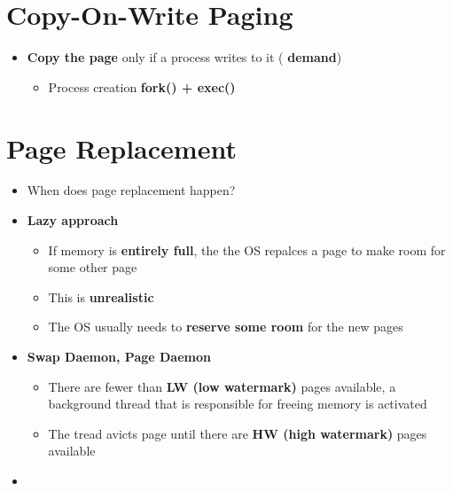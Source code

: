 \documentclass[a4paper,11pt,english]{article}
\begin{document}
\section*{Copy-On-Write Paging}
\begin{itemize}
    \item \textbf{\color{blue} Copy the page} only if a process writes to it (\textbf{\color{blue} demand})
        \begin{itemize}
            \item Process creation \textbf{\color{blue} fork() + exec()}
        \end{itemize}
\end{itemize}

\section*{Page Replacement}
\begin{itemize}
    \item When does page replacement happen?
    \item \textbf{\color{blue} Lazy approach}
        \begin{itemize}
            \item If memory is \textbf{\color{red} entirely full}, the the OS repalces a page to make room for some other page
            \item This is \textbf{\color{red} unrealistic}
            \item The OS usually needs to \textbf{\color{blue} reserve some room} for the new pages
        \end{itemize}
    \item \textbf{\color{blue} Swap Daemon, Page Daemon}
        \begin{itemize}
            \item There are fewer than \textbf{\color{red} LW (low watermark)} pages available, a background thread that is responsible for freeing memory is activated 
            \item The tread avicts page until there are \textbf{\color{blue} HW (high watermark)} pages available
        \end{itemize}
    \item 
\end{itemize}
\end{document}
